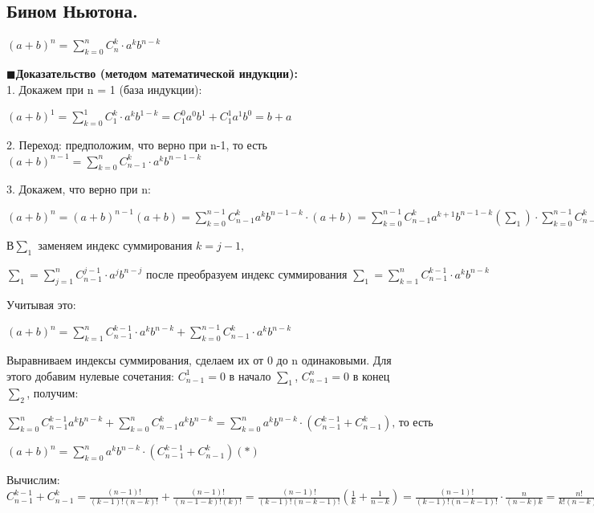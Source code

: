 \documentclass[12pt, a4paper, oneside]{article}
\theoremstyle{plain} %
\theoremstyle{definition}
\begin{document}
\subsection{Бином Ньютона.}


$(a+b)^n = \sum\limits_{k=0}^n  C_{n}^{k} \cdot a^k b^{n-k}$

\(\blacksquare\)\textbf{Доказательство (методом математической индукции):}\\

1. Докажем при n = 1 (база индукции):

$(a+b)^1 = \sum\limits_{k=0}^1  C_{1}^{k} \cdot a^k b^{1-k} = C_{1}^{0}a^0b^1 + C_{1}^{1}a^1b^0 = b + a$

2. Переход: предположим, что верно при n-1, то есть $(a + b)^{n-1} = \sum\limits_{k=0}^n  C_{n-1}^{k} \cdot a^k b^{n-1-k}$

3. Докажем, что верно при n:

$(a+b)^{n} = (a+b)^{n-1}(a+b) = \sum\limits_{k=0}^{n-1} C_{n-1}^{k} a^k b^{n-1-k} \cdot (a+b) = \sum\limits_{k=0}^{n-1} C_{n-1}^{k} a^{k+1} b^{n-1-k}(\sum_1) \cdot \sum\limits_{k=0}^{n-1} C_{n-1}^{k} a^k b^{n-k}(\sum_2) $

$\textrm{В} \sum_1 \text{ заменяем индекс суммирования } {k={j-1}},$ 

$\sum_1=\sum\limits_{j=1}^{n}  C_{n-1}^{j-1} \cdot a^{j} b^{n-j} \text{ после преобразуем индекс суммирования }  \sum_1 = \sum\limits_{k=1}^{n}  C_{n-1}^{k-1} \cdot a^k b^{n-k}$

\textrm{Учитывая это:}

$(a+b)^n = \sum\limits_{k=1}^{n}  C_{n-1}^{k-1} \cdot a^{k} b^{n-k} + \sum\limits_{k=0}^{n-1}  C_{n-1}^{k} \cdot a^{k} b^{n-k}$

Выравниваем индексы суммирования, сделаем их от 0 до n одинаковыми. Для этого добавим нулевые сочетания:
$C_{n-1}^1=0$ в начало $\sum_1$, $C_{n-1}^n = 0$ в конец $\sum_2$, получим:

$\sum\limits_{k=0}^{n} C_{n-1}^{k-1} a^k b^{n-k} +  \sum\limits_{k=0}^{n} C_{n-1}^{k} a^k b^{n-k}  = \sum\limits_{k=0}^n  a^k b^{n-k} \cdot (C_{n-1}^{k-1} + C_{n-1}^{k}) \text{, то есть}$ 

$(a+b)^n =  \sum\limits_{k=0}^n  a^k b^{n-k} \cdot (C_{n-1}^{k-1} + C_{n-1}^{k} ) (*)$



\textrm{Вычислим:}
$C_{n-1}^{k-1} + C_{n-1}^{k}= \frac{(n-1)!}{(k-1)!(n-k)!} + \frac{(n-1)!}{(n-1-k)!(k)!}= \frac{(n-1)!}{(k-1)!(n-k-1)!}(\frac{1}{k}+ \frac{1}{n-k}) = \frac{(n-1)!}{(k-1)!(n-k-1)!} \cdot \frac{n}{(n-k)k} = \frac{n!}{k!(n-k)!} = C^{k}_n \textrm{ (подставим это в равенство *)}
$
\end{document}
